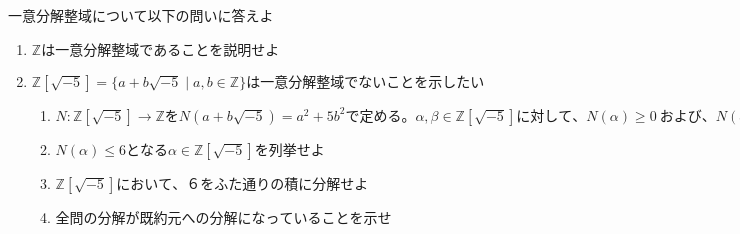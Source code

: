 \documentclass[dvipdfmx]{jsarticle}
\begin{document}
\begin{tcolorbox}[colframe=black!50,colback=white,colbacktitle=black!50,coltitle=white,fonttitle=\bfseries\sffamily,title=問題5]
一意分解整域について以下の問いに答えよ
\begin{enumerate}
  \item $\mathbb{Z}は一意分解整域であることを説明せよ$
  \item $\mathbb{Z}[\sqrt{-5}] = \{ a+b\sqrt{-5} \mid a,b \in \mathbb{Z} \}は一意分解整域でないことを示したい$
  \begin{enumerate}
    \item $N:\mathbb{Z}[\sqrt{-5}] \rightarrow \mathbb{Z}をN(a+b\sqrt{-5}) = a^2+5b^2で定める。\alpha,\beta \in \mathbb{Z}[\sqrt{-5}]に対して、N(\alpha) \geq 0 \ および、N(\alpha \beta) = N(\alpha)N(\beta)を示せ $
    \item $N(\alpha) \leq 6となる\alpha \in \mathbb{Z}[\sqrt{-5}]を列挙せよ$
    \item $\mathbb{Z}[\sqrt{-5}]において、６をふた通りの積に分解せよ$
    \item $全問の分解が既約元への分解になっていることを示せ$
  \end{enumerate}
\end{enumerate}
\end{tcolorbox}
\end{document}
